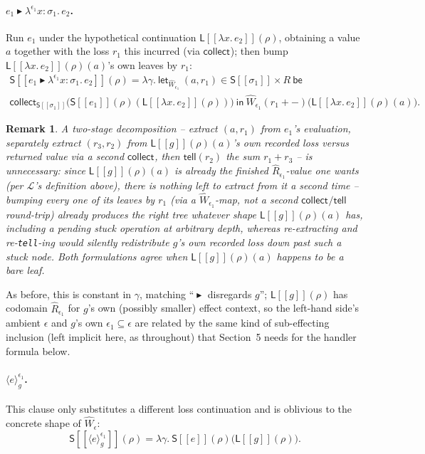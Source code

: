 \documentclass[11pt]{article}
\theoremstyle{plain}
\newtheorem{remark}[theorem]{Remark}
\newcommand{\Ssem}[1]{\mathsf{S}[\![#1]\!]}
\newcommand{\Lsem}[1]{\mathsf{L}[\![#1]\!]}
\newcommand{\Wm}[1]{\widehat{W}_{#1}}
\newcommand{\Rm}[1]{\widehat{R}_{#1}}
\newcommand{\eps}{\epsilon}
\newcommand{\then}{\mathrel{\blacktriangleright}}
\newcommand{\loc}[1]{\langle #1 \rangle} %
\newcommand{\tell}{\mathsf{tell}}
\newcommand{\collectX}[1]{\mathsf{collect}_{#1}}
\begin{document}
\paragraph{$e_1\then\lambda^{\eps_1} x\!:\!\sigma_1.\,e_2$.} Run $e_1$ under the hypothetical
continuation $\Lsem{\lambda x.\,e_2}(\rho)$, obtaining a value $a$ together with the loss $r_1$
this incurred (via $\collectX{}$); then bump $\Lsem{\lambda x.\,e_2}(\rho)(a)$'s own leaves by
$r_1$:
\begin{multline*}
  \Ssem{e_1\then\lambda^{\eps_1}x\!:\!\sigma_1.\,e_2}(\rho) = \lambda\gamma.\
    \mathsf{let}_{\Wm{\eps_1}}\ (a,r_1)\in\Ssem{\sigma_1}\times R\ \mathsf{be}\ \\
      \mathsf{collect}_{\Ssem{\sigma_1}}\big(\Ssem{e_1}(\rho)(\Lsem{\lambda x.\,e_2}(\rho))\big)\ \mathsf{in}\
      \Wm{\eps_1}(r_1+{-})\big(\Lsem{\lambda x.\,e_2}(\rho)(a)\big).
\end{multline*}
\begin{remark}
A two-stage decomposition -- extract $(a,r_1)$ from $e_1$'s evaluation, separately extract
$(r_3,r_2)$ from $\Lsem{g}(\rho)(a)$'s own recorded loss versus returned value via a second
$\collectX{}$, then $\tell(r_2)$ the sum $r_1+r_3$ -- is unnecessary: since $\Lsem
g(\rho)(a)$ is already the finished $\Rm{\eps_1}$-value one wants (per $\mathcal L$'s
definition above), there is nothing left to extract from it a second time -- bumping every
one of its leaves by $r_1$ (via a $\Wm{\eps_1}$-map, not a second $\collectX{}/\tell$
round-trip) already produces the right tree \emph{whatever shape} $\Lsem g(\rho)(a)$ has,
including a pending stuck operation at arbitrary depth, whereas re-extracting and
re-\texttt{tell}-ing would silently redistribute $g$'s own recorded loss down past such a
stuck node. Both formulations agree when $\Lsem g(\rho)(a)$ happens to be a bare leaf.
\end{remark}
As before, this is constant in $\gamma$, matching ``$\then$ disregards $g$''; $\Lsem g(\rho)$
has codomain $\Rm{\eps_1}$ for $g$'s own (possibly smaller) effect context, so the left-hand
side's ambient $\eps$ and $g$'s own $\eps_1\subseteq\eps$ are related by the same kind of
sub-effecting inclusion (left implicit here, as throughout) that Section~5 needs for the
handler formula below.

\paragraph{$\loc{e}_g^{\eps_1}$.} This clause only substitutes a different loss continuation
and is oblivious to the concrete shape of $\Wm\eps$:
\[
  \Ssem{\loc{e}_g^{\eps_1}}(\rho) = \lambda\gamma.\ \Ssem{e}(\rho)\big(\Lsem{g}(\rho)\big).
\]
\end{document}
